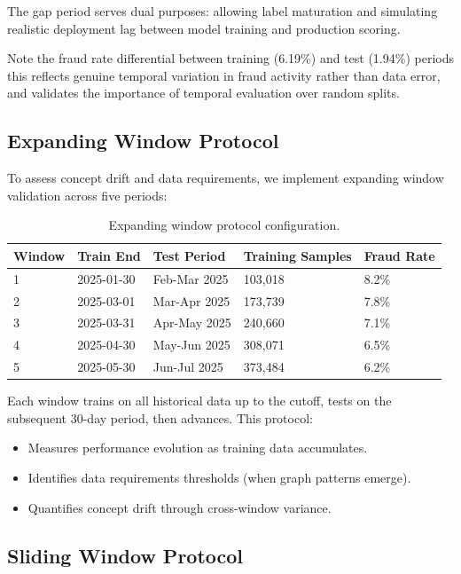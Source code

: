 The gap period serves dual purposes: allowing label maturation and simulating realistic deployment lag between model training and production scoring.

Note the fraud rate differential between training (6.19\%) and test (1.94\%) periods this reflects genuine temporal variation in fraud activity rather than data error, and validates the importance of temporal evaluation over random splits.

\subsection{Expanding Window Protocol}

To assess concept drift and data requirements, we implement expanding window validation across five periods:

\begin{table}[h]
\centering
\caption{Expanding window protocol configuration.}
\begin{tabular}{lllll}
\hline
Window & Train End & Test Period & Training Samples & Fraud Rate \\
\hline
1 & 2025-01-30 & Feb-Mar 2025 & 103,018 & 8.2\% \\
2 & 2025-03-01 & Mar-Apr 2025 & 173,739 & 7.8\% \\
3 & 2025-03-31 & Apr-May 2025 & 240,660 & 7.1\% \\
4 & 2025-04-30 & May-Jun 2025 & 308,071 & 6.5\% \\
5 & 2025-05-30 & Jun-Jul 2025 & 373,484 & 6.2\% \\
\hline
\end{tabular}
\end{table}

Each window trains on all historical data up to the cutoff, tests on the subsequent 30-day period, then advances. This protocol:
\begin{itemize}
    \item Measures performance evolution as training data accumulates.
    \item Identifies data requirements thresholds (when graph patterns emerge).
    \item Quantifies concept drift through cross-window variance.
\end{itemize}

\subsection{Sliding Window Protocol}


